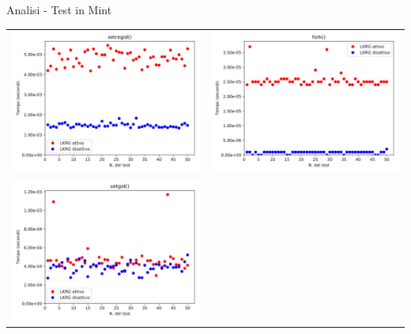 \documentclass[12pt]{beamer}
\begin{document}
  \begin{frame}[fragile]{Analisi - Test in Mint}
  	\begin{tabular}{ c c }
    	\includegraphics[scale=0.11]{res/Mint/Setregid} &
    	\includegraphics[scale=0.11]{res/Mint/Fork}\\
    	\includegraphics[scale=0.11]{res/Mint/Setgid} & 

\end{tabular}
\end{frame}
\end{document}
